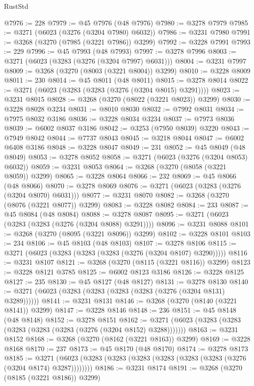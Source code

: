 \begin{lexlean}{RustStd}
\begin{coremodule}
@7976 := 228
@7979 := @45 @7976 (@48 @7976)
@7980 := @3278 @7979
@7985 := @3271 (@6023 (@3276 (@3204 @7980) @6032))
@7986 := @3231 @7980
@7991 := @3268 (@3270 (@7985 (@3221 @7986)) @3299)
@7992 := @3228 @7991
@7993 := 229
@7996 := @45 @7993 (@48 @7993)
@7997 := @3278 @7996
@8003 := @3271 (@6023 (@3283 (@3276 (@3204 @7997) @6031)))
@8004 := @3231 @7997
@8009 := @3268 (@3270 (@8003 (@3221 @8004)) @3299)
@8010 := @3228 @8009
@8011 := 230
@8014 := @45 @8011 (@48 @8011)
@8015 := @3278 @8014
@8022 := @3271 (@6023 (@3283 (@3283 (@3276 (@3204 @8015) @3291))))
@8023 := @3231 @8015
@8028 := @3268 (@3270 (@8022 (@3221 @8023)) @3299)
@8030 := @3228 @8028 @3234
@8031 := @8010 @8030
@8032 := @7992 @8031
@8034 := @7975 @8032 @3186
@8036 := @3228 @8034 @3234
@8037 := @7973 @8036
@8039 := @6002 @8037 @3186
@8042 := @3253 (@7950 @8039) @3220
@8043 := @7949 @8042
@8044 := @7737 @8043
@8045 := @3218 @8044
@8047 := @6002 @6408 @3186
@8048 := @3228 @8047
@8049 := 231
@8052 := @45 @8049 (@48 @8049)
@8053 := @3278 @8052
@8058 := @3271 (@6023 (@3276 (@3204 @8053) @6032))
@8059 := @3231 @8053
@8064 := @3268 (@3270 (@8058 (@3221 @8059)) @3299)
@8065 := @3228 @8064
@8066 := 232
@8069 := @45 @8066 (@48 @8066)
@8070 := @3278 @8069
@8076 := @3271 (@6023 (@3283 (@3276 (@3204 @8070) @6031)))
@8077 := @3231 @8070
@8082 := @3268 (@3270 (@8076 (@3221 @8077)) @3299)
@8083 := @3228 @8082
@8084 := 233
@8087 := @45 @8084 (@48 @8084)
@8088 := @3278 @8087
@8095 := @3271 (@6023 (@3283 (@3283 (@3276 (@3204 @8088) @3291))))
@8096 := @3231 @8088
@8101 := @3268 (@3270 (@8095 (@3221 @8096)) @3299)
@8102 := @3228 @8101
@8103 := 234
@8106 := @45 @8103 (@48 @8103)
@8107 := @3278 @8106
@8115 := @3271 (@6023 (@3283 (@3283 (@3283 (@3276 (@3204 @8107) @3290)))))
@8116 := @3231 @8107
@8121 := @3268 (@3270 (@8115 (@3221 @8116)) @3299)
@8123 := @3228 @8121 @3785
@8125 := @6002 @8123 @3186
@8126 := @3228 @8125
@8127 := 235
@8130 := @45 @8127 (@48 @8127)
@8131 := @3278 @8130
@8140 := @3271 (@6023 (@3283 (@3283 (@3283 (@3283 (@3276 (@3204 @8131) @3289))))))
@8141 := @3231 @8131
@8146 := @3268 (@3270 (@8140 (@3221 @8141)) @3299)
@8147 := @3228 @8146
@8148 := 236
@8151 := @45 @8148 (@48 @8148)
@8152 := @3278 @8151
@8162 := @3271 (@6023 (@3283 (@3283 (@3283 (@3283 (@3283 (@3276 (@3204 @8152) @3288)))))))
@8163 := @3231 @8152
@8168 := @3268 (@3270 (@8162 (@3221 @8163)) @3299)
@8169 := @3228 @8168
@8170 := 237
@8173 := @45 @8170 (@48 @8170)
@8174 := @3278 @8173
@8185 := @3271 (@6023 (@3283 (@3283 (@3283 (@3283 (@3283 (@3283 (@3276 (@3204 @8174) @3287))))))))
@8186 := @3231 @8174
@8191 := @3268 (@3270 (@8185 (@3221 @8186)) @3299)

\end{coremodule}
\end{lexlean}
